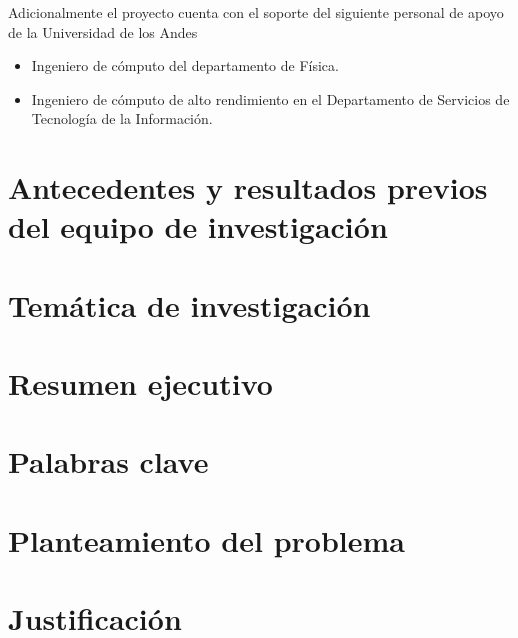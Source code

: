 \documentclass[12pt]{article}
\begin{document}
\noindent
Adicionalmente el proyecto cuenta con el soporte del siguiente
personal de apoyo de la Universidad de los Andes 

\begin{itemize}
\item{Ingeniero de c\'omputo del departamento de F\'isica.}
\item{Ingeniero de c\'omputo de alto rendimiento en el Departamento de Servicios de Tecnolog\'ia de la Informaci\'on}.
\end{itemize}

\section{Antecedentes y resultados previos del equipo de
  investigaci\'on} 

\section{Tem\'atica de investigaci\'on}

\section{Resumen ejecutivo}


\section{Palabras clave}


\section{Planteamiento del problema}


\section{Justificaci\'on}
\end{document}

